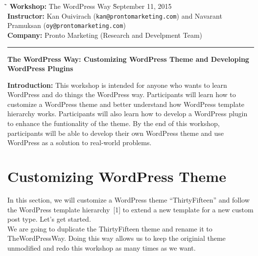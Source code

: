 \documentclass{article}
\begin{document}
\begin{tabbing}
    \`\=\kill
    \textbf{Workshop:} The WordPress Way
    \` September 11, 2015 \\
    \textbf{Instructor:} Kan Ouivirach ({\tt \small kan@prontomarketing.com})
        and Navarant Pramuksan ({\tt \small oy@prontomarketing.com}) \\
    \textbf{Company:} Pronto Marketing (Research and Develpment Team)
\end{tabbing}

\hrule

\vspace{.25in}

\begin{center}
    \textbf{\Large The WordPress Way: Customizing WordPress Theme and
        Developing WordPress Plugins}
\end{center}

\vspace{.15in}

\noindent \textbf{Introduction:} This workshop is intended for anyone who wants
to learn WordPress and do things the WordPress way. Participants will learn how
to customize a WordPress theme and better understand how WordPress template
hierarchy works. Participants will also learn how to develop a WordPress plugin
to enhance the funtionality of the theme.  By the end of this workshop,
participants will be able to develop their own WordPress theme and use
WordPress as a solution to real-world problems.

\section*{Customizing WordPress Theme}

\noindent In this section, we will customize a WordPress theme
``ThirtyFifteen'' and follow the WordPress template hierarchy~[1] to extend a
new template for a new custom post type. Let's get started. \\

\noindent We are going to duplicate the ThirtyFifteen theme and rename it to
TheWordPressWay. Doing this way allows us to keep the originial theme
unmodified and redo this workshop as many times as we want.
\end{document}
